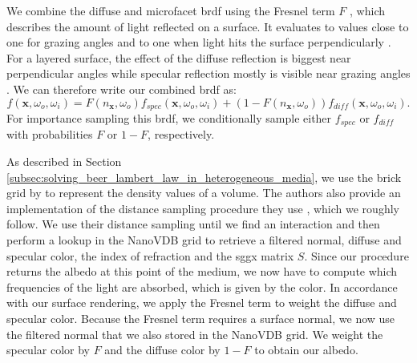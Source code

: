 We combine the diffuse and microfacet \ac{brdf} using the Fresnel term $F$ \cite{fresnel}, which describes the amount of light reflected on a surface.
It evaluates to values close to one for grazing angles and to one when light hits the surface perpendicularly \cite{pbr}.
For a layered surface, the effect of the diffuse reflection is biggest near perpendicular angles while specular reflection mostly is visible near grazing angles \cite{pbr}.
We can therefore write our combined \ac{brdf} as:
\begin{equation}
    f(\boldsymbol{x}, \omega_o, \omega_i) = F(n_{\boldsymbol{x}}, \omega_o)f_{spec}(\boldsymbol{x}, \omega_o, \omega_i) + (1 - F(n_{\boldsymbol{x}}, \omega_o))f_{diff}(\boldsymbol{x}, \omega_o, \omega_i).
    \label{eq:layered_brdf}
\end{equation}
For importance sampling this \ac{brdf}, we conditionally sample either $f_{spec}$ or $f_{diff}$ with probabilities $F$ or $1-F$, respectively.

As described in Section \ref{subsec:solving_beer_lambert_law_in_heterogeneous_media}, we use the brick grid by \citeauthor{brick_grid} \cite{brick_grid} to represent the density values of a volume.
The authors also provide an implementation of the distance sampling procedure they use \cite{brick_grid}, which we roughly follow.
We use their distance sampling until we find an interaction and then perform a lookup in the NanoVDB grid to retrieve a filtered normal, diffuse and specular color, the index of refraction and the \ac{sggx} matrix $S$.
Since our procedure returns the albedo at this point of the medium, we now have to compute which frequencies of the light are absorbed, which is given by the color.
In accordance with our surface rendering, we apply the Fresnel term to weight the diffuse and specular color.
Because the Fresnel term requires a surface normal, we now use the filtered normal that we also stored in the NanoVDB grid.
We weight the specular color by $F$ and the diffuse color by $1-F$ to obtain our albedo.

